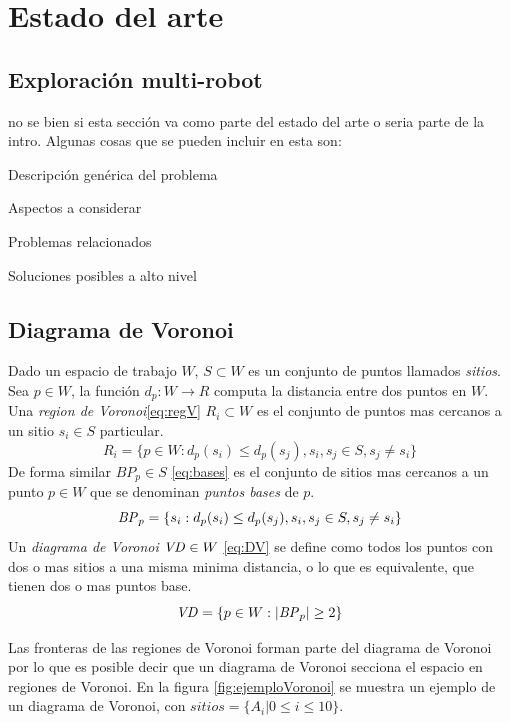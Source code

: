 \section{Estado del arte}


\subsection{Exploración multi-robot}
no se bien si esta sección va como parte del estado del arte o seria parte de la intro. Algunas cosas que se pueden incluir en esta son:

Descripción genérica del problema

Aspectos a considerar

Problemas relacionados

Soluciones posibles a alto nivel

\subsection{Diagrama de Voronoi}\cite{choset2005principles}\cite{Thrun1998}
Dado un espacio de trabajo $W$, $S \subset W$ es un conjunto de puntos llamados \emph{sitios}. Sea $p\in W$, la función $d_p : W \rightarrow R$ computa la distancia entre dos puntos en $W$. Una \emph{region de Voronoi}\ref{eq:regV} $R_i\subset W$ es el conjunto de puntos mas cercanos a un sitio $s_i\in S$ particular.
\begin{equation}
  R_i = \{p \in W : d_p(s_i) \leq d_p(s_j), s_i,s_j\in S,s_j \neq s_i\}\label{eq:regV}
\end{equation}
De forma similar $BP_p \in S$ \ref{eq:bases} es el conjunto de sitios mas cercanos a un punto $p \in W$ que se denominan \emph{puntos bases} de $p$.
\begin{equation}
  \mathit{BP}_p =\{s_i : d_p(s_i) \leq d_p(s_j), s_i,s_j\in S,s_j \neq s_i\}\label{eq:bases}
\end{equation}
Un \emph{diagrama de Voronoi} $\mathit{VD}\in W$ \ref{eq:DV} se define como todos los puntos con dos o mas sitios a una misma minima distancia, o lo que es equivalente, que tienen dos o mas puntos base.
\begin{equation}
  \mathit{VD} = \{p \in W : |\mathit{BP}_p| \geq 2\}\label{eq:DV}
\end{equation}

Las fronteras de las regiones de Voronoi forman parte del diagrama de Voronoi por lo que es posible decir que un diagrama de Voronoi secciona el espacio en regiones de Voronoi. En la figura \ref{fig:ejemploVoronoi} se muestra un ejemplo de un diagrama de Voronoi, con $sitios=\{A_i | 0\leq i \leq 10\}$.

